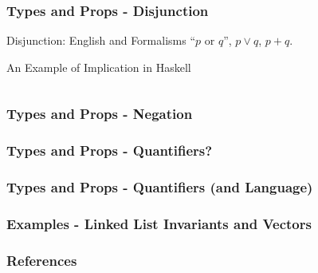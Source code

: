 \documentclass
  [hyperref={colorlinks = true,linkcolor = blue, 
             citecolor = blue, urlcolor = blue}
  ]{beamer}
\begin{document}
\begin{frame}[fragile]
  \frametitle{Types and Props - Disjunction}
  \begin{block}{Disjunction: English and Formalisms}
  ``$p$ or $q$'', $p \lor q$, $p + q$.
  \end{block}
  \begin{block}{An Example of Implication in Haskell}
  \inputminted{Haskell}{../Code/src/Disjunction.hs}
  \end{block}
\end{frame}

\begin{frame}[fragile]
  \frametitle{Types and Props - Negation}

\end{frame}

\begin{frame}[fragile]
  \frametitle{Types and Props - Quantifiers?}
\end{frame}

\begin{frame}[fragile]
  \frametitle{Types and Props - Quantifiers (and Language)}
\end{frame}

\begin{frame}[fragile]
  \frametitle{Examples - Linked List Invariants and Vectors}
\end{frame}

\begin{frame}[fragile]
\frametitle{References}
{}
\end{frame}
\end{document}
